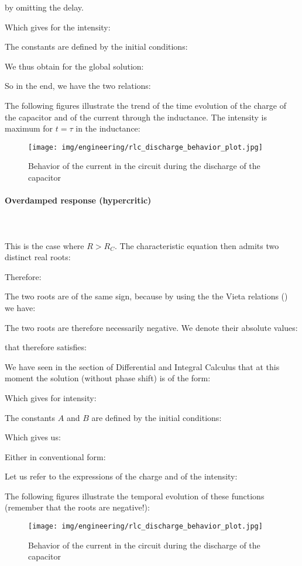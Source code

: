 	by omitting the delay.
	
	Which gives for the intensity:
	
	The constants are defined by the initial conditions:
	
	We thus obtain for the global solution:
	
	So in the end, we have the two relations:
	
	The following figures illustrate the trend of the time evolution of the charge of the capacitor and of the current through the inductance. The intensity is maximum for $t=\tau$ in the inductance:
	\begin{figure}[H]
		\centering
		\texttt{[image: img/engineering/rlc\_discharge\_behavior\_plot.jpg]}
		\caption[]{Behavior of the current in the circuit during the discharge of the capacitor}
	\end{figure}
	
	\paragraph{Overdamped response (hypercritic)}\mbox{}\\\\
	This is the case where $R>R_C$. The characteristic equation then admits two distinct real roots:
	
	Therefore:
	
	The two roots are of the same sign, because by using the the Vieta relations () we have:
	
	The two roots are therefore necessarily negative. We denote their absolute values:
	
	that therefore satisfies:
	
	We have seen in the section of Differential and Integral Calculus that at this moment the solution (without phase shift) is of the form:
	
	Which gives for intensity:
	
	The constants $A$ and $B$ are defined by the initial conditions:
	
	Which gives us:
	
	Either in conventional form:
	
	Let us refer to the expressions of the charge and of the intensity:
	
	The following figures illustrate the temporal evolution of these functions (remember that the roots are negative!):
	 \begin{figure}[H]
		\centering
		\texttt{[image: img/engineering/rlc\_discharge\_behavior\_plot.jpg]}
		\caption[]{Behavior of the current in the circuit during the discharge of the capacitor}
	\end{figure}
	
